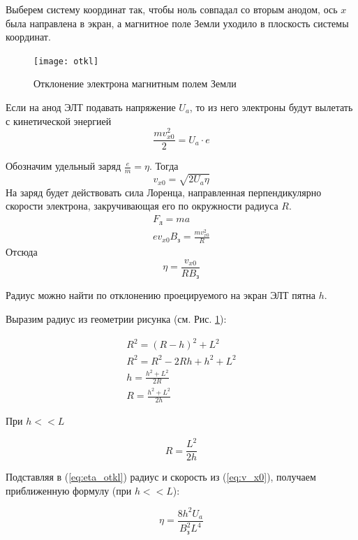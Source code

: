 Выберем систему координат так, чтобы ноль совпадал со вторым анодом, ось $x$ была направлена в экран, а магнитное поле Земли уходило в плоскость системы координат.

\begin{figure}[ht!]
	\centering
	\texttt{[image: otkl]}
	\caption{Отклонение электрона магнитным полем Земли}
	\label{fig:otkl}
\end{figure}

Если на анод ЭЛТ подавать напряжение $U_a$, то из него электроны будут вылетать с кинетической энергией 
\begin{equation}
	\frac{mv_{x0}^2}{2}=U_a\cdot{}e
\end{equation}

Обозначим удельный заряд $\frac{e}{m}=\eta$. Тогда 
\begin{equation}
	v_{x0}=\sqrt{2U_a\eta}
	\label{eq:v_x0}
\end{equation}
%
На заряд будет действовать сила Лоренца, направленная перпендикулярно скорости электрона, закручивающая его по окружности радиуса $R$.
%
\begin{gather}
F_\text{л}=ma\\
ev_{x0}B_\text{з}=\frac{mv_{x0}^2}{R}
\end{gather}
%
Отсюда
%
\begin{equation}
	\eta=\frac{v_{x0}}{RB_\text{з}}
	\label{eq:eta_otkl}
\end{equation}

Радиус можно найти по отклонению проецируемого на экран ЭЛТ пятна $h$. 

Выразим радиус из геометрии рисунка (см. Рис. \ref{fig:otkl}):

\begin{gather}
	R^2=(R-h)^2+L^2\\
	R^2=R^2-2Rh+h^2+L^2\\
	h=\frac{h^2+L^2}{2R}\\
	R=\frac{h^2+L^2}{2h}
\end{gather}

При $h<<L$

\begin{equation}
	R=\frac{L^2}{2h}
\end{equation}

Подставляя в (\ref{eq:eta_otkl}) радиус и скорость из (\ref{eq:v_x0}), получаем  приближенную формулу (при $h<<L$):

\begin{equation}
	\eta=\frac{8h^2U_a}{B_\text{з}^2L^4}	
	\label{eta1}
\end{equation}

